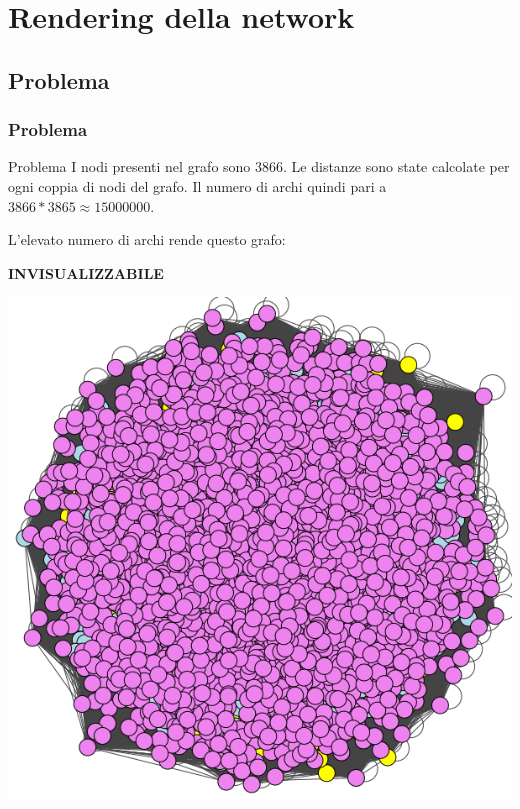 \documentclass{beamer}
\begin{document}
\section{Rendering della network}
\subsection{Problema}
\begin{frame}
\frametitle{Problema}
\begin{alertblock}{Problema}
I nodi presenti nel grafo sono 3866.
Le distanze sono state calcolate per ogni coppia di nodi del grafo. Il numero di archi  quindi pari a $3866 * 3865 \approx 15000000$.
\end{alertblock}
L'elevato numero di archi rende questo grafo:\\
\begin{center}
\textbf{INVISUALIZZABILE}
\end{center}
\end{frame}

\begin{frame}
\begin{center}
\includegraphics[scale=0.3]{img/inside.png} 
\end{center}
\end{frame}
\end{document}
